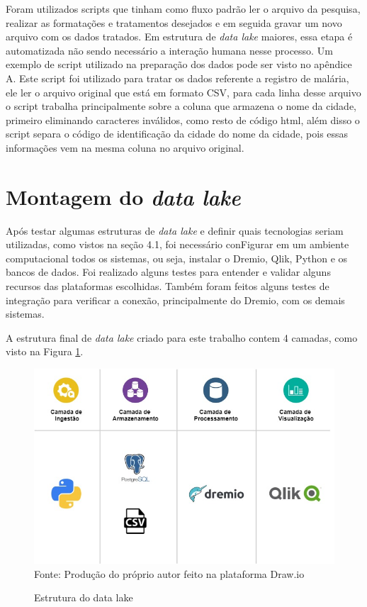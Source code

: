 \documentclass[
	12pt,				%
	openright,			%
	oneside,			%
	a4paper,			%
	chapter=TITLE,		%
	section=TITLE,		%
	subsection=TITLE,	%
	subsubsection=TITLE,%
	english,			%
	brazil				%
	]{abntex2}
\theoremstyle{definition}
\begin{document}
    Foram utilizados scripts que tinham como fluxo padrão ler o arquivo da pesquisa, realizar as formatações e tratamentos desejados e em seguida gravar um novo arquivo com os dados tratados. Em estrutura de \textit{data lake} maiores, essa etapa é automatizada não sendo necessário a interação humana nesse processo. Um exemplo de script utilizado na preparação dos dados pode ser visto no apêndice A. Este script foi utilizado para tratar os dados referente a registro de malária, ele ler o arquivo original que está em formato CSV, para cada linha desse arquivo o script trabalha principalmente sobre a coluna que armazena o nome da cidade, primeiro eliminando caracteres inválidos, como resto de código html, além disso o script separa o código de identificação da cidade do nome da cidade, pois essas informações vem na mesma coluna no arquivo original.
    
    
\section{Montagem do \textit{data lake}}

    Após testar algumas estruturas de \textit{data lake} e definir quais tecnologias seriam utilizadas, como vistos na seção 4.1, foi necessário conFigurar em um ambiente computacional todos os sistemas, ou seja, instalar o Dremio, Qlik, Python e os bancos de dados. Foi realizado alguns testes para entender e validar alguns recursos das plataformas escolhidas. Também foram feitos alguns testes de integração para verificar a conexão, principalmente do Dremio, com os demais sistemas.
    
    A estrutura final de \textit{data lake} criado para este trabalho contem 4 camadas, como visto na Figura \ref{estrura data lake}.
    
    \begin{figure}[H]
         \centering
         \caption{Estrutura do data lake}
         \includegraphics[scale=0.4]{imagens/meu-datalake.jpg}
         \\{\footnotesize Fonte: Produção do próprio autor feito na plataforma Draw.io}
         \label{estrura data lake}
    \end{figure}
    
\end{document}
